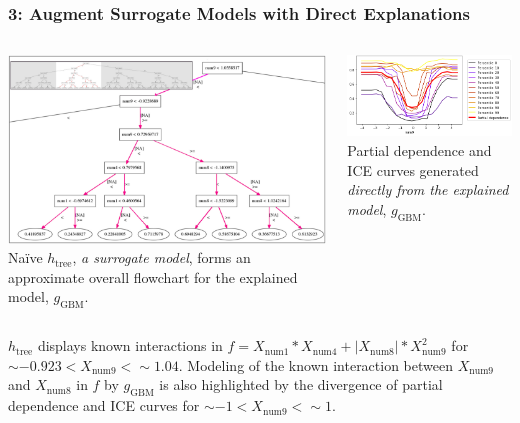 \documentclass[11pt,aspectratio=169,hyperref={colorlinks}]{beamer}
\begin{document}
	\begin{frame}[t]
	
		\frametitle{3: Augment \textbf{Surrogate Models} with \textbf{Direct Explanations}}	
	
		\begin{columns}
				
			\centering			
			\includegraphics[height=0.6\linewidth, width=.95\linewidth]{../img/figure_3-eps-converted-to.png}\\
  			\tiny{Na\"ive $h_{\text{tree}}$, \textit{a surrogate model}, forms an approximate overall flowchart for the explained model, $g_{\text{GBM}}$.}

			\hspace{5pt}
  			\includegraphics[height=.52\linewidth, width=1.02\linewidth]{../img/figure_4.png}\\
  			\tiny{Partial dependence and ICE curves generated \textit{directly from the explained model}, $g_{\text{GBM}}$.}
  			
  		\end{columns}

	\scriptsize{$h_{\text{tree}}$ displays known interactions in $f = X_{\text{num}1} * X_{\text{num}4} + |X_{\text{num}8}| * X_{\text{num}9}^2$ for $\sim -0.923 < X_{\text{num9}} <  \sim 1.04$. Modeling of the known interaction between $X_{\text{num9}}$ and $X_{\text{num8}}$ in $f$ by $g_{\text{GBM}}$ is also highlighted by the divergence of partial dependence and ICE curves for $\sim -1 < X_{\text{num9}} <  \sim 1$.}

	\end{frame}
\end{document}
